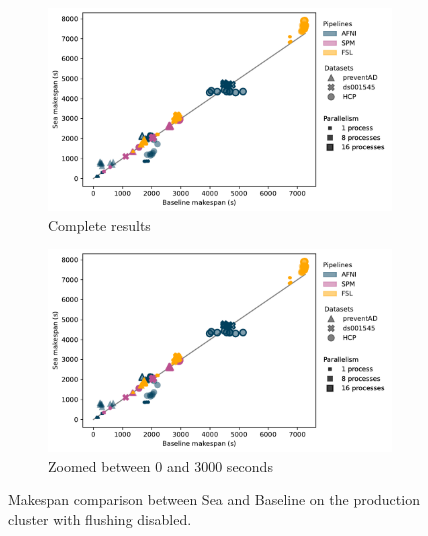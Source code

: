 \documentclass[pdflatex,sn-mathphys-num]{sn-jnl}
\theoremstyle{thmstyleone}%
\theoremstyle{thmstyletwo}%
\theoremstyle{thmstylethree}%
\begin{document}

\begin{figure}[h!]
  \centering

\begin{subfigure}{\textwidth}
    \centering
    \captionsetup{width=\linewidth}
    \includegraphics[width=\textwidth]{figures/beluga_withoutflush_nozoom_updated.pdf}%
    \caption{Complete results}\label{fig:seaneuro:belugafull}
\end{subfigure}
\begin{subfigure}{\textwidth}
    \centering
    \captionsetup{width=\linewidth}
    \includegraphics[width=\textwidth]{figures/beluga_withoutflush_nozoom_updated.pdf}
    \caption{Zoomed between 0 and 3000 seconds}\label{fig:seaneuro:belugazoom}
\end{subfigure}
\caption{Makespan comparison between Sea and Baseline on the production cluster with flushing disabled. }
\label{fig:seaneuro:beluga-noflush}
\end{figure}
\end{document}
